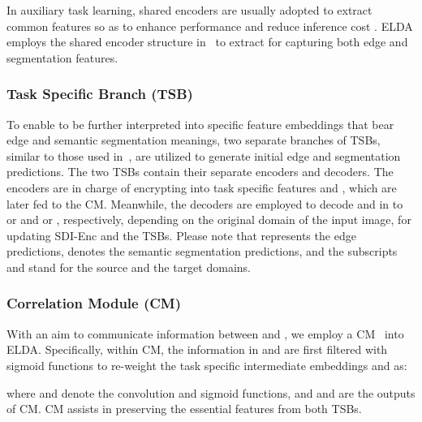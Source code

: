 \documentclass{bmvc2k}
\begin{document}
In auxiliary task learning, shared encoders are
usually adopted to extract common features so as to enhance performance and reduce inference cost \cite{mtinet}. ELDA employs the shared encoder structure in~\cite{wang2021domain} to extract 
for capturing both edge and segmentation features.






\subsubsection{Task Specific Branch (TSB)}
\label{subsubsec::TSB}

To enable  to be further interpreted into specific feature embeddings that bear edge and semantic segmentation meanings, two separate branches of TSBs, similar to those used in~\cite{mtinet, wang2021domain}, are utilized to generate initial edge and segmentation predictions. The two TSBs contain their separate encoders and decoders. The encoders are in charge of encrypting  into task specific features  and , which are later fed to the CM. Meanwhile, the decoders are employed to decode  and  in to  or  and  or , respectively, depending on the original domain of the input image, for updating SDI-Enc and the TSBs. Please note that  represents the edge predictions,  denotes the semantic segmentation predictions, and the subscripts  and  stand for the source and the target domains. 



\subsubsection{Correlation Module (CM)}
\label{subsubsec::CM}
With an aim to communicate information between 
 and , we employ a CM~\cite{padnet, wang2021domain} into ELDA. Specifically, 
within CM, the information in  and  are first filtered with sigmoid functions to re-weight the task specific intermediate embeddings  and  as:



where  and  denote the convolution and sigmoid functions, and  and  are the outputs of CM.  CM assists in preserving the essential features from both TSBs. 
\end{document}

